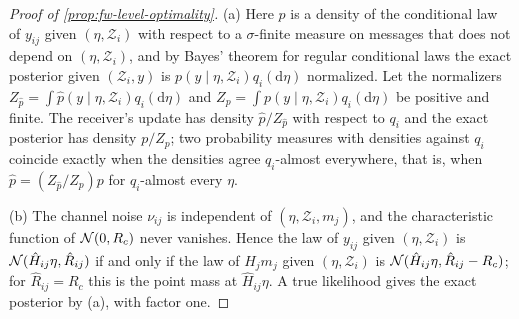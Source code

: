 \begin{proof}[Proof of \cref{prop:fw-level-optimality}]
(a) Here $p$ is a density of the conditional law of $y_{ij}$ given $(\eta,\mathcal Z_i)$ with respect to a $\sigma$-finite measure on messages that does not depend on $(\eta,\mathcal Z_i)$, and by Bayes' theorem for regular conditional laws the exact posterior given $(\mathcal Z_i,y)$ is $p(y\mid\eta,\mathcal Z_i)q_i(\mathrm d\eta)$ normalized. Let the normalizers $Z_{\hat p}=\int\hat p(y\mid\eta,\mathcal Z_i)q_i(\mathrm d\eta)$ and $Z_p=\int p(y\mid\eta,\mathcal Z_i)q_i(\mathrm d\eta)$ be positive and finite. The receiver's update has density $\hat p/Z_{\hat p}$ with respect to $q_i$ and the exact posterior has density $p/Z_p$; two probability measures with densities against $q_i$ coincide exactly when the densities agree $q_i$-almost everywhere, that is, when $\hat p=(Z_{\hat p}/Z_p)p$ for $q_i$-almost every $\eta$.

(b) The channel noise $\nu_{ij}$ is independent of $(\eta,\mathcal Z_i,m_j)$, and the characteristic function of $\mathcal{N}(0,R_c)$ never vanishes. Hence the law of $y_{ij}$ given $(\eta,\mathcal Z_i)$ is $\mathcal{N}(\hat H_{ij}\eta,\hat R_{ij})$ if and only if the law of $H_jm_j$ given $(\eta,\mathcal Z_i)$ is $\mathcal{N}(\hat H_{ij}\eta,\hat R_{ij}-R_c)$; for $\hat R_{ij}=R_c$ this is the point mass at $\hat H_{ij}\eta$. A true likelihood gives the exact posterior by (a), with factor one.


\end{proof}
